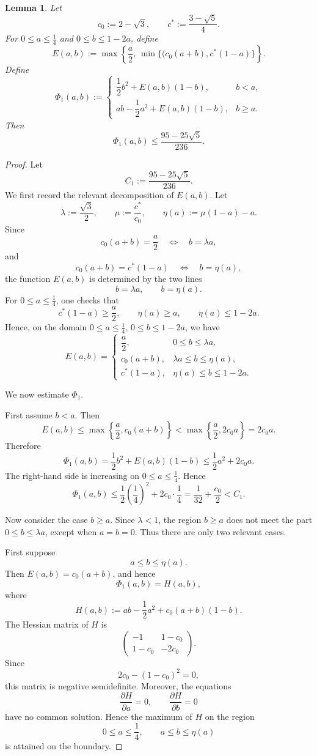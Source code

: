 \documentclass[runningheads,envcountsame,a4paper]{llncs}
\newtheorem{lem}[thm]{Lemma}
\begin{document}
\begin{lem}\label{lem:optimization-case1}
Let
\[
c_0:=2-\sqrt{3},\qquad c^*:=\frac{3-\sqrt{5}}{4}.
\]
For \(0\leq a\leq \frac14\) and \(0\leq b\leq 1-2a\), define
\[
E(a,b):=
\max\left\{
\frac a2,\,
\min\{(c_0(a+b),c^*(1-a)\}
\right\}.
\]
Define
\[
\Phi_1(a,b):=
\begin{cases}
\dfrac12 b^2+E(a,b)(1-b), & b<a,\\[6pt]
ab-\dfrac12a^2+E(a,b)(1-b), & b\geq a.
\end{cases}
\]
Then
\[
\Phi_1(a,b)\leq \frac{95-25\sqrt5}{236}.
\]
\end{lem}

\begin{proof}
Let
\[
C_1:=\frac{95-25\sqrt5}{236}.
\]
We first record the relevant decomposition of \(E(a,b)\). Let
\[
\lambda:=\frac{\sqrt3}{2},\qquad 
\mu:=\frac{c^*}{c_0},\qquad 
\eta(a):=\mu(1-a)-a.
\]
Since
\[
c_0(a+b)=\frac a2
\quad\Longleftrightarrow\quad
b=\lambda a,
\]
and
\[
c_0(a+b)=c^*(1-a)
\quad\Longleftrightarrow\quad
b=\eta(a),
\]
the function \(E(a,b)\) is determined by the two lines
\[
b=\lambda a,\qquad b=\eta(a).
\]
For \(0\leq a\leq \frac14\), one checks that
\[
c^*(1-a)\geq \frac a2,\qquad
\eta(a)\geq a,\qquad
\eta(a)\leq 1-2a.
\]
Hence, on the domain \(0\leq a\leq \frac14\), \(0\leq b\leq 1-2a\), we have
\[
E(a,b)=
\begin{cases}
\dfrac a2, & 0\leq b\leq \lambda a,\\[6pt]
c_0(a+b), & \lambda a\leq b\leq \eta(a),\\[6pt]
c^*(1-a), & \eta(a)\leq b\leq 1-2a.
\end{cases}
\]

We now estimate \(\Phi_1\).

First assume \(b<a\). Then
\[
E(a,b)\leq \max\left\{\frac a2,c_0(a+b)\right\}
<\max\left\{\frac a2,2c_0a\right\}
=2c_0a.
\]
Therefore
\[
\Phi_1(a,b)
=
\frac12b^2+E(a,b)(1-b)
\leq \frac12a^2+2c_0a.
\]
The right-hand side is increasing on \(0\leq a\leq \frac14\). Hence
\[
\Phi_1(a,b)
\leq
\frac12\left(\frac14\right)^2+2c_0\cdot\frac14
=
\frac1{32}+\frac{c_0}{2}
<C_1.
\]

Now consider the case \(b\geq a\). Since \(\lambda<1\), the region
\(b\geq a\) does not meet the part \(0\leq b\leq \lambda a\), except when
\(a=b=0\). Thus there are only two relevant cases.

First suppose
\[
a\leq b\leq \eta(a).
\]
Then \(E(a,b)=c_0(a+b)\), and hence
\[
\Phi_1(a,b)=H(a,b),
\]
where
\[
H(a,b):=
ab-\frac12a^2+c_0(a+b)(1-b).
\]
The Hessian matrix of \(H\) is
\[
\begin{pmatrix}
-1 & 1-c_0\\
1-c_0 & -2c_0
\end{pmatrix}.
\]
Since
\[
2c_0-(1-c_0)^2=0,
\]
this matrix is negative semidefinite. Moreover, the equations
\[
\frac{\partial H}{\partial a}=0,\qquad
\frac{\partial H}{\partial b}=0
\]
have no common solution. Hence the maximum of \(H\) on the region
\[
0\leq a\leq \frac14,\qquad a\leq b\leq \eta(a)
\]
is attained on the boundary.


\end{proof}
\end{document}
